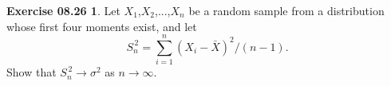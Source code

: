 




 \theoremstyle{definition}  %
   \newtheorem*{exercise1}{Exercise 08.26}

%

\begin{flushleft}               %
  
  \end{flushleft}

\vspace{1cm}

\begin{exercise1}
  Let $X_1$,$X_2$,...,$X_n$ be a random sample from a distribution whose first four moments exist, and let 
  $$
    S_n^{\,2}=\sum_{i=1}^n(X_i-\bar{X})^2/(n-1).
  $$ 
  Show that $ S_n^{\,2}\to \sigma^2$ as $n\to \infty$.
\end{exercise1}

